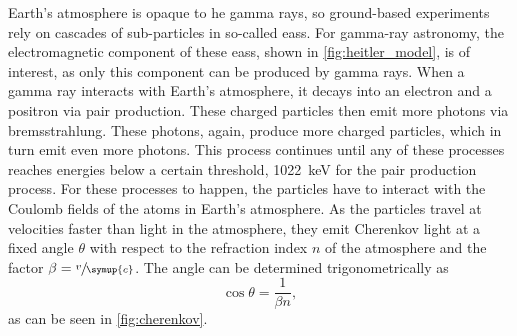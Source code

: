 Earth's atmosphere is opaque to \gls{he} gamma rays, so ground-based experiments rely on
cascades of sub-particles in so-called \glspl{eas}. For gamma-ray astronomy, the electromagnetic
component of these \glspl{eas}, shown in \autoref{fig:heitler_model}, is of interest, as only this
component can be produced by gamma rays. When a gamma ray interacts with Earth's atmosphere, it decays into an
electron and a positron via pair production. These charged particles then emit more photons via
bremsstrahlung. These photons, again, produce more charged particles, which in turn emit even more
photons. This process continues until any of these processes reaches energies below a certain
threshold, \ie \SI{1022}{\kilo\eV} for the pair production process. For these processes to happen,
the particles have to interact with the Coulomb fields of the atoms in Earth's atmosphere. As the particles
travel at velocities faster than light in the atmosphere, they emit Cherenkov light at
a fixed angle \(\theta\) with respect to the refraction index \(n\) of the atmosphere and the
factor \(\beta = \sfrac{v}{\symup{c}}\). The angle can be determined trigonometrically as
\begin{equation}
    \cos\theta = \frac{1}{\beta n},
\end{equation}
as can be seen in \autoref{fig:cherenkov}.

